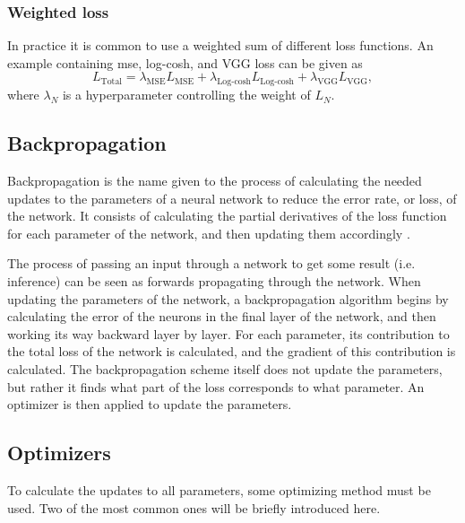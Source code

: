 \subsubsection{Weighted loss}
In practice it is common to use a weighted sum of different loss functions. 
An example containing \gls{mse}, log-cosh, and VGG loss can be given as
\begin{equation}
    \label{eq:weightedloss}
    L_{\text{Total}} = \lambda_{\text{MSE}}L_{\text{MSE}} + \lambda_{\text{Log-cosh}}L_{\text{Log-cosh}} + \lambda_{\text{VGG}}L_{\text{VGG}},
\end{equation}
where $\lambda_N$ is a hyperparameter controlling the weight of $L_N$. 

\subsection{Backpropagation}
Backpropagation is the name given to the process of calculating the needed updates to the parameters of a neural network to reduce the error rate, or loss, of the network. It consists of calculating the partial derivatives of the loss function for each parameter of the network, and then updating them accordingly \cite{Rumelhart1986}. 

The process of passing an input through a network to get some result (i.e. inference) can be seen as forwards propagating through the network. When updating the parameters of the network, a backpropagation algorithm begins by calculating the error of the neurons in the final layer of the network, and then working its way backward layer by layer. For each parameter, its contribution to the total loss of the network is calculated, and the gradient of this contribution is calculated. The backpropagation scheme itself does not update the parameters, but rather it finds what part of the loss corresponds to what parameter. An optimizer is then applied to update the parameters.

\subsection{Optimizers}
To calculate the updates to all parameters, some optimizing method must be used. Two of the most common ones will be briefly introduced here.

